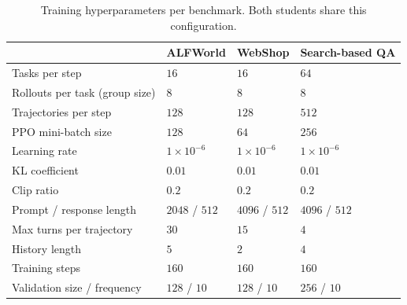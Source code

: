 \begin{table}[h]
\centering
\small
\setlength{\tabcolsep}{6pt}
\renewcommand{\arraystretch}{1.05}
\begin{tabular}{l l l l}
\toprule
 & \textbf{ALFWorld} & \textbf{WebShop} & \textbf{Search-based QA} \\
\midrule
Tasks per step               & $16$              & $16$              & $64$ \\
Rollouts per task (group size) & $8$             & $8$               & $8$ \\
Trajectories per step        & $128$             & $128$             & $512$ \\
PPO mini-batch size          & $128$             & $64$              & $256$ \\
Learning rate                & $1\times10^{-6}$  & $1\times10^{-6}$  & $1\times10^{-6}$ \\
KL coefficient               & $0.01$            & $0.01$            & $0.01$ \\
Clip ratio                   & $0.2$             & $0.2$             & $0.2$ \\
Prompt / response length     & $2048$ / $512$    & $4096$ / $512$    & $4096$ / $512$ \\
Max turns per trajectory        & $30$              & $15$              & $4$ \\
History length               & $5$               & $2$               & $4$ \\
Training steps               & $160$             & $160$             & $160$ \\
Validation size / frequency  & $128$ / $10$      & $128$ / $10$      & $256$ / $10$ \\
\bottomrule
\end{tabular}
\vspace{4pt}
\caption{Training hyperparameters per benchmark. Both students share this configuration.}
\label{tab:train_hparams}
\end{table}

